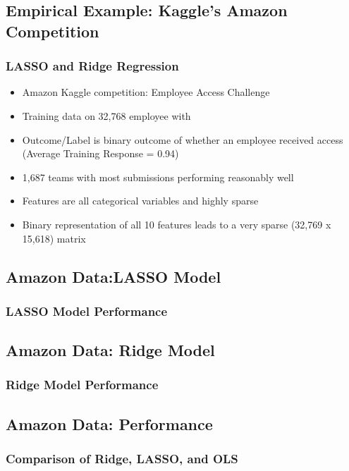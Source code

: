 \documentclass[]{beamer}
\begin{document}
\subsection{Empirical Example: Kaggle's Amazon Competition}
\begin{frame}
\frametitle{LASSO and Ridge Regression}
\begin{itemize}
\item<1-> Amazon Kaggle competition: Employee Access Challenge
\item<2-> Training data on 32,768 employee with 
\item<3-> Outcome/Label is binary outcome of whether an employee received access (Average Training Response = 0.94)
\item<4-> 1,687 teams with most submissions performing reasonably well 
\item<5-> Features are all categorical variables and highly sparse
\item<6-> Binary representation of all 10 features leads to a very sparse (32,769 x 15,618) matrix
\end{itemize}
\end{frame}

\subsection{Amazon Data:LASSO Model}
\begin{frame}
\frametitle{LASSO Model Performance}
\framebox{
}
\end{frame}

\subsection{Amazon Data: Ridge Model}
\begin{frame}
\frametitle{Ridge Model Performance}
\framebox{
}
\end{frame}


\subsection{Amazon Data: Performance}
\begin{frame}
\frametitle{Comparison of Ridge, LASSO, and OLS}
\framebox{
}
\end{frame}
\end{document}
